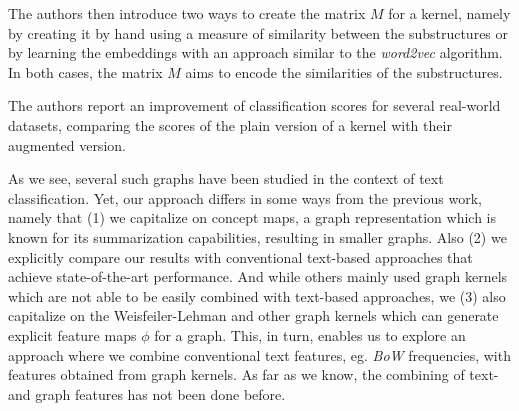 The authors then introduce two ways to create the matrix $M$ for a kernel, namely by creating it by hand using a measure of similarity between the substructures or by learning the embeddings with an approach similar to the \textit{word2vec} algorithm.
In both cases, the matrix $M$ aims to encode the similarities of the substructures.

The authors report an improvement of classification scores for several real-world datasets, comparing the scores of the plain version of a kernel with their augmented version.

As we see, several such graphs have been studied in the context of text classification.
Yet, our approach differs in some ways from the previous work, namely that (1) we capitalize on concept maps, a graph representation which is known for its summarization capabilities, resulting in smaller graphs. Also (2) we explicitly compare our results with conventional text-based approaches that achieve state-of-the-art performance. And while others mainly used graph kernels which are not able to be easily combined with text-based approaches, we (3) also capitalize on the Weisfeiler-Lehman and other graph kernels which can generate explicit feature maps $\phi$ for a graph.
This, in turn, enables us to explore an approach where we combine conventional text features, eg. \textit{BoW} frequencies, with features obtained from graph kernels.
As far as we know, the combining of text- and graph features has not been done before.